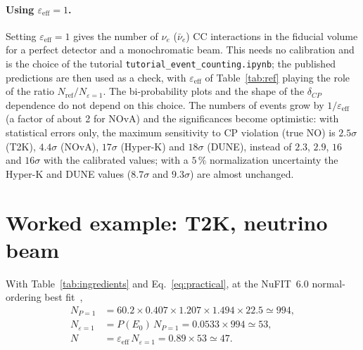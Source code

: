 \documentclass[11pt,a4paper]{article}
\newcommand{\nue}{\nu_e}
\newcommand{\nuebar}{\bar\nu_e}
\begin{document}
\paragraph{Using $\varepsilon_\text{eff}=1$.} Setting $\varepsilon_\text{eff}=1$ gives the number of $\nue$ ($\nuebar$)
CC interactions in the fiducial volume for a perfect detector and a monochromatic beam. This needs no calibration and
is the choice of the tutorial \texttt{tutorial\_event\_counting.ipynb}; the published predictions are then used as a
check, with $\varepsilon_\text{eff}$ of Table~\ref{tab:ref} playing the role of the ratio
$N_\text{ref}/N_{\varepsilon=1}$. The bi-probability plots and the shape of the $\delta_{CP}$ dependence do not depend
on this choice. The numbers of events grow by $1/\varepsilon_\text{eff}$ (a factor of about 2 for NOvA) and the
significances become optimistic: with statistical errors only, the maximum sensitivity to CP violation (true NO) is
$2.5\sigma$ (T2K), $4.4\sigma$ (NOvA), $17\sigma$ (Hyper-K) and $18\sigma$ (DUNE), instead of $2.3$, $2.9$, $16$ and
$16\sigma$ with the calibrated values; with a $5\,\%$ normalization uncertainty the Hyper-K and DUNE values ($8.7\sigma$
and $9.3\sigma$) are almost unchanged.

\section{Worked example: T2K, neutrino beam}

With Table~\ref{tab:ingredients} and Eq.~\eqref{eq:practical}, at the NuFIT~6.0 normal-ordering best fit~\cite{Esteban:2024eli},
\begin{align}
  N_{P=1} &= 60.2 \times 0.407 \times 1.207 \times 1.494 \times 22.5 \simeq 994, \\
  N_{\varepsilon=1} &= P(E_0)\,N_{P=1} = 0.0533 \times 994 \simeq 53, \\
  N &= \varepsilon_\text{eff}\,N_{\varepsilon=1} = 0.89 \times 53 \simeq 47 .
\end{align}
\end{document}
